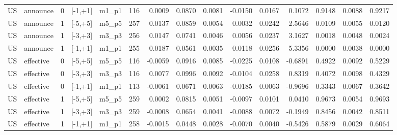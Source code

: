 \begin{tabular}{llrllrrrrrrrrrr}
US & announce & 0 & [-1,+1] & m1_p1 & 116 & 0.0009 & 0.0870 & 0.0081 & -0.0150 & 0.0167 & 0.1072 & 0.9148 & 0.0088 & 0.9217 \\
US & announce & 1 & [-5,+5] & m5_p5 & 257 & 0.0137 & 0.0859 & 0.0054 & 0.0032 & 0.0242 & 2.5646 & 0.0109 & 0.0055 & 0.0120 \\
US & announce & 1 & [-3,+3] & m3_p3 & 256 & 0.0147 & 0.0741 & 0.0046 & 0.0056 & 0.0237 & 3.1627 & 0.0018 & 0.0048 & 0.0024 \\
US & announce & 1 & [-1,+1] & m1_p1 & 255 & 0.0187 & 0.0561 & 0.0035 & 0.0118 & 0.0256 & 5.3356 & 0.0000 & 0.0038 & 0.0000 \\
US & effective & 0 & [-5,+5] & m5_p5 & 116 & -0.0059 & 0.0916 & 0.0085 & -0.0225 & 0.0108 & -0.6891 & 0.4922 & 0.0092 & 0.5229 \\
US & effective & 0 & [-3,+3] & m3_p3 & 116 & 0.0077 & 0.0996 & 0.0092 & -0.0104 & 0.0258 & 0.8319 & 0.4072 & 0.0098 & 0.4329 \\
US & effective & 0 & [-1,+1] & m1_p1 & 113 & -0.0061 & 0.0671 & 0.0063 & -0.0185 & 0.0063 & -0.9696 & 0.3343 & 0.0067 & 0.3642 \\
US & effective & 1 & [-5,+5] & m5_p5 & 259 & 0.0002 & 0.0815 & 0.0051 & -0.0097 & 0.0101 & 0.0410 & 0.9673 & 0.0054 & 0.9693 \\
US & effective & 1 & [-3,+3] & m3_p3 & 259 & -0.0008 & 0.0654 & 0.0041 & -0.0088 & 0.0072 & -0.1949 & 0.8456 & 0.0042 & 0.8511 \\
US & effective & 1 & [-1,+1] & m1_p1 & 258 & -0.0015 & 0.0448 & 0.0028 & -0.0070 & 0.0040 & -0.5426 & 0.5879 & 0.0029 & 0.6064 \\
\bottomrule
\end{tabular}
